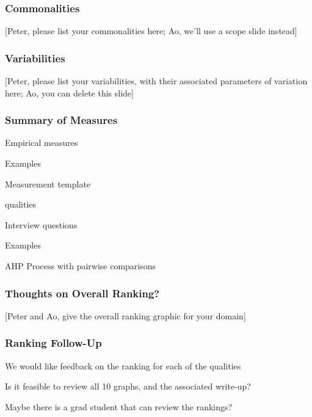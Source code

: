 \documentclass[t,12pt,numbers,fleqn]{beamer}
\begin{document}

\begin{frame}
\frametitle{Commonalities}

[Peter, please list your commonalities here; Ao, we'll use a scope slide
instead]

\end{frame}


\begin{frame}
\frametitle{Variabilities}

[Peter, please list your variabilities, with their associated parameters of
variation here; Ao, you can delete this slide]

\end{frame}


\begin{frame}
\frametitle{Summary of Measures}

\bi
\item Empirical measures
  \bi
  \item Examples
  \ei
\item Measurement template
  \bi
  \item qualities
  \ei
\item Interview questions
  \bi
  \item Examples
  \ei
  \item AHP Process with pairwise comparisons
\ei
\end{frame}


\begin{frame}
\frametitle{Thoughts on Overall Ranking?}

[Peter and Ao, give the overall ranking graphic for your domain]

\end{frame}


\begin{frame}
\frametitle{Ranking Follow-Up}

\bi
\item We would like feedback on the ranking for each of the qualities
\item Is it feasible to review all 10 graphs, and the associated write-up?
\item Maybe there is a grad student that can review the rankings?
 \ei

\end{frame}
\end{document}
